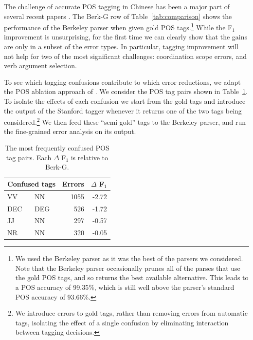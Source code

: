 The challenge of accurate POS tagging in Chinese has been a major part of
several recent papers
\parencite{Qian-Liu:2012:EMNLP,Jiang-etal:2009:ACL,Forst-Fang:2009:EACL}.  The
Berk-G row of Table~\ref{tab:comparison} shows the performance of the Berkeley
parser when given gold POS tags.\footnote{We used the Berkeley parser as it was
the best of the parsers we considered.  Note that the Berkeley parser
occasionally prunes all of the parses that use the gold POS tags,
and so returns the best available alternative.  This leads to a POS accuracy of
99.35\%, which is still well above the parser's standard POS accuracy of
93.66\%.}
While the F$_1$ improvement is unsurprising, for the
first time we can clearly show that the gains are only in a subset of the error
types.  In particular, tagging improvement will not help for two of the most
significant challenges: coordination scope errors, and verb argument
selection.

To see which tagging confusions contribute to which error reductions, we adapt the POS
ablation approach of \textcite{Tse-Curran:2012:NAACL-HLT}.  We consider the POS
tag pairs shown in Table~\ref{tab:pos-confusion}.  To isolate the effects of
each confusion we start from the gold tags and introduce the output of the
Stanford tagger whenever it returns one of the two tags being
considered.\footnote{We introduce errors to gold tags, rather than removing
errors from automatic tags, isolating the effect of a single confusion
by eliminating interaction between tagging decisions.}
We then feed these ``semi-gold'' tags to the
Berkeley parser, and run the fine-grained error analysis on its output.

\begin{table}
  \centering
  \begin{tabular}{|llrr|}
    \hline
      \multicolumn{2}{c}{Confused tags} & Errors & $\Delta$ F$_1$ \\
    \hline
    \hline
      VV  & NN  & 1055 & -2.72 \\
      DEC & DEG &  526 & -1.72 \\
      JJ  & NN  &  297 & -0.57 \\
      NR  & NN  &  320 & -0.05 \\
    \hline
  \end{tabular}
  \caption[The most frequently confused POS tag pairs in Chinese parsing.]{ \label{tab:pos-confusion}
    The most frequently confused POS tag pairs.
    Each $\Delta$ F$_1$ is relative to Berk-G.
  }
\end{table}

